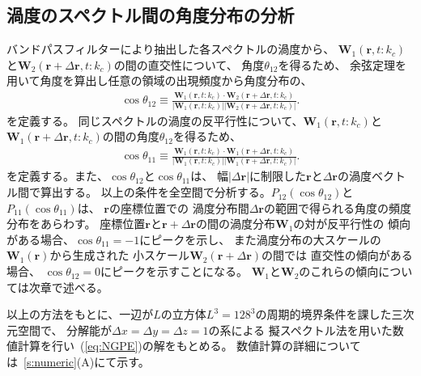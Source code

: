 \documentclass[12pt,a4paper]{jbook}
\begin{document}
		\subsection{渦度のスペクトル間の角度分布の分析}
		バンドパスフィルターにより抽出した各スペクトルの渦度から、
        $\bm{W}_1(\bm{r},t:k_c)$と$\bm{W}_2(\bm{r}+\Delta\bm{r},t:k_c)$の間の直交性について、
        角度$\theta_{12}$を得るため、
        余弦定理を用いて角度を算出し任意の領域の出現頻度から角度分布の、
		\begin{eqnarray}
			\label{eq:ORTH}
			\cos \theta_{12}
			\equiv \frac{{\bm W}_1({\bm r},t:k_c) \cdot {\bm W}_2({\bm r} + \Delta {\bm r},t:k_c) }
			{
				|{\bm W}_1({\bm r},t:k_c)| |{\bm W}_2({\bm r} + \Delta {\bm r},t:k_c)|
			}.
		\end{eqnarray}
        を定義する。
		同じスペクトルの渦度の反平行性について、$\bm{W}_1(\bm{r},t:k_c)$と
        $\bm{W}_1(\bm{r}+\Delta\bm{r},t:k_c)$の間の角度$\theta_{12}$を得るため、
		\begin{eqnarray}
			\label{eq:ANTI}
			\cos \theta_{11}
			\equiv \frac{{\bm W}_1({\bm r},t:k_c) \cdot {\bm W}_1({\bm r} + \Delta {\bm r},t:k_c) }
			{
				|{\bm W}_1({\bm r},t:k_c)| |{\bm W}_1({\bm r} + \Delta {\bm r},t:k_c)|
			}.
		\end{eqnarray}
		を定義する。また、$\cos \theta_{12}$と$\cos \theta_{11}$は、
		幅$|\Delta{\bm r}|$に制限した$\bm r$と$\Delta{\bm r}$の渦度ベクトル間で算出する。
		以上の条件を全空間で分析する。$P_{12}(\cos \theta_{12})$と$P_{11}(\cos \theta_{11})$は、
		$\bm r$の座標位置での
		渦度分布間$\Delta{\bm r}$の範囲で得られる角度の頻度分布をあらわす。
		座標位置${\bm r}$と$\bm{r}+\Delta \bm{r}$の間の渦度分布${\bm W}_1$の対が反平行性の
		傾向がある場合、$\cos \theta_{11}=-1$にピークを示し、
		また渦度分布の大スケールの${\bm W}_1(\bm{r})$から生成された
		小スケール${\bm W}_2(\bm{r}+\Delta \bm{r})$の間では
		直交性の傾向がある場合、
		$\cos \theta_{12}=0$にピークを示すことになる。
		$\bm{W}_1$と$\bm{W}_2$のこれらの傾向については次章で述べる。



		以上の方法をもとに、一辺が$L$の立方体$L^3=128^3$の周期的境界条件を課した三次元空間で、
        分解能が$\Delta x = \Delta y = \Delta z = 1$の系による
		擬スペクトル法を用いた数値計算を行い~(\ref{eq:NGPE})の解をもとめる。
        数値計算の詳細については~\ref{s:numeric}(A)にて示す。
\end{document}
